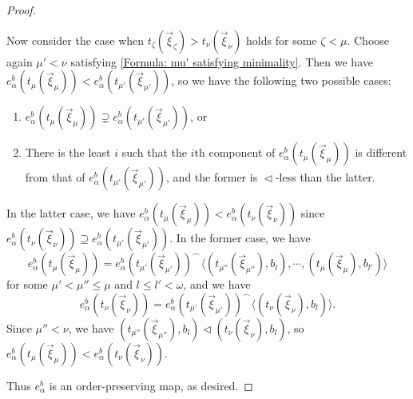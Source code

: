 \documentclass{mhkr}
\newcommand{\lag}{\langle}
\newcommand{\rag}{\rangle}
\begin{document}
\begin{proof}
\begin{enumerate}
        Now consider the case when $t_\zeta(\vec{\xi}_\zeta) > t_\nu(\vec{\xi}_\nu)$ holds for some $\zeta<\mu$.
        Choose again $\mu'<\nu$ satisfying \eqref{Formula: mu' satisfying minimality}. Then we have $e^b_\alpha(t_\mu(\vec{\xi}_\mu))<e^b_\alpha(t_{\mu'}(\vec{\xi}_{\mu'}))$, so we have the following two possible cases:
        \begin{enumerate}
            \item $e^b_\alpha(t_\mu(\vec{\xi}_\mu))\supsetneq e^b_\alpha(t_{\mu'}(\vec{\xi}_{\mu'}))$, or
            \item There is the least $i$ such that the $i$th component of $e^b_\alpha(t_\mu(\vec{\xi}_\mu))$ is different from that of $e^b_\alpha(t_{\mu'}(\vec{\xi}_{\mu'}))$, and the former is $\vartriangleleft$-less than the latter.
        \end{enumerate}
        In the latter case, we have $e^b_\alpha(t_\mu(\vec{\xi}_\mu))<e^b_\alpha(t_\nu(\vec{\xi}_\nu))$ since $e^b_\alpha(t_\nu(\vec{\xi}_\nu))\supseteq e^b_\alpha(t_{\mu'}(\vec{\xi}_{\mu'}))$.
        In the former case, we have
        \begin{equation*}
            e^b_\alpha(t_\mu(\vec{\xi}_\mu)) = e^b_\alpha(t_{\mu'}(\vec{\xi}_{\mu'}))^\frown \lag (t_{\mu''}(\vec{\xi}_{\mu''}),b_{l}),\cdots, (t_{\mu}(\vec{\xi}_{\mu}),b_{l'}) \rag
        \end{equation*}
        for some $\mu'<\mu''\le \mu$ and $l\le l'<\omega$, and we have
        \begin{equation*}
            e^b_\alpha(t_\nu(\vec{\xi}_\nu)) = e^b_\alpha(t_{\mu'}(\vec{\xi}_{\mu'}))^\frown \lag (t_{\nu}(\vec{\xi}_{\nu}),b_{l}) \rag.
        \end{equation*}
        Since $\mu''<\nu$, we have $(t_{\mu''}(\vec{\xi}_{\mu''}),b_{l}) \vartriangleleft (t_{\nu}(\vec{\xi}_{\nu}),b_{l})$, so  $e^b_\alpha(t_\mu(\vec{\xi}_\mu)) <  e^b_\alpha(t_\nu(\vec{\xi}_\nu))$.
    \end{enumerate}
    Thus $e^b_\alpha$ is an order-preserving map, as desired.
\end{proof}
\end{document}
